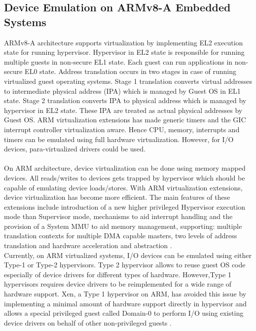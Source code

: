 \subsection{Device Emulation on ARMv8-A Embedded Systems\label{sec:3gpp}}
ARMv8-A architecture supports virtualization by implementing EL2 execution state for running hypervisor. Hypervisor in EL2 state is responsible for running multiple guests in non-secure EL1 state. Each guest can run applications in non-secure EL0 state. Address translation occurs in two stages in case of running virtualized guest operating systems. Stage 1 translation converts virtual addresses to intermediate physical address (IPA) which is managed by Guest OS in EL1 state. Stage 2 translation converts IPA to physical address which is managed by hypervisor in EL2 state. These IPA are treated as actual physical addresses by Guest OS. ARM virtualization extensions has made generic timers and the GIC interrupt controller virtualization aware. Hence CPU, memory, interrupts and timers can be emulated using full hardware virtualization. However, for I/O devices, para-virtualized drivers could be used.\\
\\
On ARM architecture, device virtualization can be done using memory mapped devices. All reads/writes to devices gets trapped by hypervisor which should be capable of emulating device loads/stores. With ARM virtualization extensions, device virtualization has become more efficient. The main features of these extensions include  introduction of a new higher privileged Hypervisor execution mode than Supervisor mode, mechanisms to aid interrupt handling and the provision of a System MMU to aid memory management, supporting: multiple translation contexts for multiple DMA capable masters, two levels of address translation and hardware acceleration and abstraction \cite{ARM_VE}.
\\
Currently, on ARM virtualized systems, I/O devices can be emulated using either Type-1 or Type-2 hypervisors. Type 2 hypervisor allows to reuse guest OS code especially of device drivers for different types of hardware. However,Type 1 hypervisors requires device drivers to be reimplemented for a wide range of hardware support. Xen, a Type 1 hypervisor on ARM, has avoided this issue by implementing a minimal amount of hardware support directly in hypervisor and allows a special privileged guest called Domain-0 to perform I/O using existing device drivers on behalf of other non-privileged guests \cite{dall_li_lim_nieh_koloventzos_2016}.
\\
